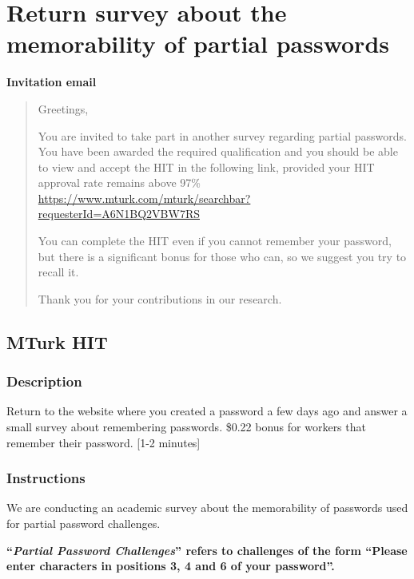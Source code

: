   \section{Return survey about the memorability of partial passwords}
    \label{aps:survey_memorability}

      \textbf{Invitation email}
      \begin{quote}
      Greetings,

      You are invited to take part in another survey regarding partial passwords. You have been awarded the required qualification and you should be able to view and accept the HIT in the following link, provided your HIT approval rate remains above 97\%\\
      \href{https://www.mturk.com/mturk/searchbar?requesterId=A6N1BQ2VBW7RS}{https://www.mturk.com/mturk/searchbar?requesterId=A6N1BQ2VBW7RS}

      You can complete the HIT even if you cannot remember your password, but there is a significant bonus for those who can, so we suggest you try to recall it.

      Thank you for your contributions in our research.
      \end{quote}

    \subsection{MTurk HIT}
      \label{apsss:memorability_hit}

    \subsubsection{Description}
      \label{apsss:memorability_hit_descr}
      Return to the website where you created a password a few days ago and answer a small survey about remembering passwords. \$0.22 bonus for workers that remember their password. [1-2 minutes]

    \subsubsection{Instructions}
      \label{apsss:memorability_hit_instr}
      We are conducting an academic survey about the memorability of passwords used for partial password challenges.

      \textbf{``\emph{Partial Password Challenges}'' refers to challenges of the form ``Please enter characters in positions 3, 4 and 6 of your password''.}

